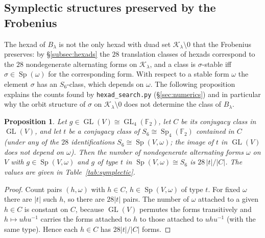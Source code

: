 \documentclass[12pt,a4paper]{amsart}
\newtheorem{proposition}[theorem]{Proposition}
\theoremstyle{definition}
\newcommand{\F}{\mathbb{F}}
\newcommand{\Sp}{\operatorname{Sp}}
\newcommand{\GL}{\operatorname{GL}}
\newcommand{\Kk}{\mathcal{K}}
\begin{document}
\subsection{Symplectic structures preserved by the Frobenius}\label{subsec:symplectic}
The hexad of $B_\lambda$ is not the only hexad with duad set $\Kk_\lambda\setminus0$ that the Frobenius preserves: by \S\ref{subsec:hexads} the $28$ translation classes of hexads correspond to the $28$ nondegenerate alternating forms on $\Kk_\lambda$, and a class is $\sigma$-stable iff $\sigma\in\Sp(\omega)$ for the corresponding form. With respect to a stable form $\omega$ the element $\sigma$ has an $S_6$-class, which depends on $\omega$. The following proposition explains the counts found by \texttt{hexad\_search.py} (\S\ref{sec:numerics}) and in particular why the orbit structure of $\sigma$ on $\Kk_\lambda\setminus0$ does not determine the class of $B_\lambda$.

\begin{proposition}\label{prop:symplectic}
Let $g\in\GL(V)\cong\GL_4(\F_2)$, let $C$ be its conjugacy class in $\GL(V)$, and let $t$ be a conjugacy class of $S_6\cong\Sp_4(\F_2)$ contained in $C$ (under any of the $28$ identifications $S_6\cong\Sp(V,\omega)$; the image of $t$ in $\GL(V)$ does not depend on $\omega$). Then the number of nondegenerate alternating forms $\omega$ on $V$ with $g\in\Sp(V,\omega)$ and $g$ of type $t$ in $\Sp(V,\omega)\cong S_6$ is $28\,|t|/|C|$. The values are given in Table~\ref{tab:symplectic}.
\end{proposition}
\begin{proof}
Count pairs $(h,\omega)$ with $h\in C$, $h\in\Sp(V,\omega)$ of type $t$. For fixed $\omega$ there are $|t|$ such $h$, so there are $28|t|$ pairs. The number of $\omega$ attached to a given $h\in C$ is constant on $C$, because $\GL(V)$ permutes the forms transitively and $h\mapsto uhu^{-1}$ carries the forms attached to $h$ to those attached to $uhu^{-1}$ (with the same type). Hence each $h\in C$ has $28|t|/|C|$ forms.
\end{proof}
\end{document}
